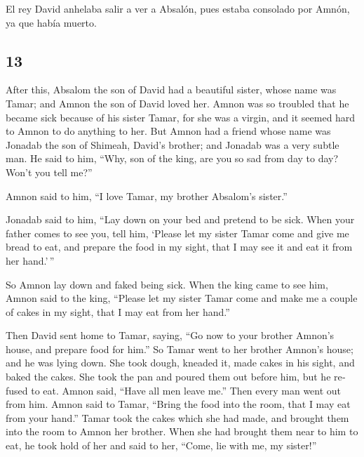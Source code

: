 \begin{paracol}{2}
 El rey David anhelaba salir a ver a Absalón, pues estaba
consolado por Amnón, ya que había muerto.

\switchcolumn
\begin{otherlanguage}{english}

\hypertarget{section-25}{%
\section{13}\label{section-25}}

 After this, Absalom the son of David had a beautiful
sister, whose name was Tamar; and Amnon the son of David loved her.
 Amnon was so troubled that he became sick because of his
sister Tamar, for she was a virgin, and it seemed hard to Amnon to do
anything to her.  But Amnon had a friend whose name was
Jonadab the son of Shimeah, David's brother; and Jonadab was a very
subtle man.  He said to him, ``Why, son of the king, are
you so sad from day to day? Won't you tell me?''

Amnon said to him, ``I love Tamar, my brother Absalom's sister.''

 Jonadab said to him, ``Lay down on your bed and pretend
to be sick. When your father comes to see you, tell him, `Please let my
sister Tamar come and give me bread to eat, and prepare the food in my
sight, that I may see it and eat it from her hand.'\,''

 So Amnon lay down and faked being sick. When the king
came to see him, Amnon said to the king, ``Please let my sister Tamar
come and make me a couple of cakes in my sight, that I may eat from her
hand.''

 Then David sent home to Tamar, saying, ``Go now to your
brother Amnon's house, and prepare food for him.''  So
Tamar went to her brother Amnon's house; and he was lying down. She took
dough, kneaded it, made cakes in his sight, and baked the cakes.
 She took the pan and poured them out before him, but he
refused to eat. Amnon said, ``Have all men leave me.'' Then every man
went out from him.  Amnon said to Tamar, ``Bring the food
into the room, that I may eat from your hand.'' Tamar took the cakes
which she had made, and brought them into the room to Amnon her brother.
 When she had brought them near to him to eat, he took
hold of her and said to her, ``Come, lie with me, my sister!''


\end{otherlanguage}
\end{paracol}

